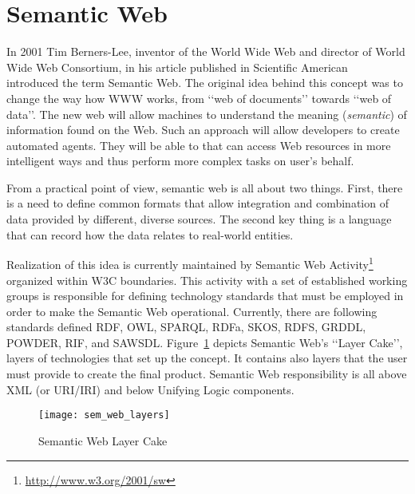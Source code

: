 %
\section{Semantic Web}
\label{sec:ch2_semantic_web}

In 2001 Tim Berners-Lee, inventor of the World Wide Web and director of World Wide Web Consortium, in his article published in Scientific American~\cite{berneslee:semanticWeb} introduced the term Semantic Web. The original idea behind this concept was to change the way how WWW works, from \lq\lq{}web of documents\rq\rq{} towards \lq\lq{}web of data\rq\rq{}. The new web will allow machines to understand the meaning (\emph{semantic}) of information found on the Web. Such an approach will allow developers to create automated agents. They will be able to that can access Web resources in more intelligent ways and thus perform more complex tasks on user\rq{}s behalf.

From a practical point of view, semantic web is all about two things. First, there is a need to define common formats that allow integration and combination of data provided by different, diverse sources. The second key thing is a language that can record how the data relates to real-world entities.

Realization of this idea is currently maintained by Semantic Web Activity\footnote{\url{http://www.w3.org/2001/sw}} organized within W3C boundaries. This activity with a set of established working groups is responsible for defining technology standards that must be employed in order to make the Semantic Web operational. Currently, there are following standards defined RDF, OWL, SPARQL, RDFa, SKOS, RDFS, GRDDL, POWDER, RIF, and SAWSDL. Figure~\ref{fig:sem_web_layers} depicts Semantic Web\rq{}s \lq\lq{}Layer Cake\rq\rq{}, layers of technologies that set up the concept. It contains also layers that the user must provide to create the final product. Semantic Web responsibility is all above XML (or URI/IRI) and below Unifying Logic components.

\begin{figure}[ht]
	\centering
	\texttt{[image: sem\_web\_layers]}
	\caption{Semantic Web Layer Cake}
	\label{fig:sem_web_layers}
\end{figure}

